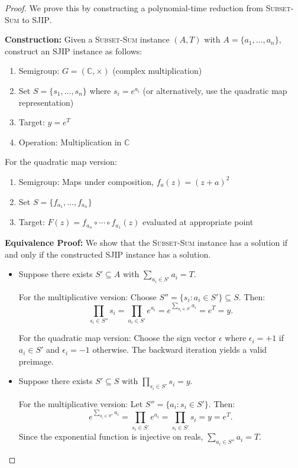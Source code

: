 \documentclass[11pt]{article}
\begin{document}
\begin{proof}
We prove this by constructing a polynomial-time reduction from \textsc{Subset-Sum} to \textsc{SJIP}.

\noindent\textbf{Construction:}
Given a \textsc{Subset-Sum} instance $(A, T)$ with $A = \{a_1, \dots, a_n\}$, construct an \textsc{SJIP} instance as follows:
\begin{enumerate}
    \item Semigroup: $G = (\mathbb{C}, \times)$ (complex multiplication)
    \item Set $S = \{s_1, \dots, s_n\}$ where $s_i = e^{a_i}$ (or alternatively, use the quadratic map representation)
    \item Target: $y = e^T$
    \item Operation: Multiplication in $\mathbb{C}$
\end{enumerate}
For the quadratic map version:
\begin{enumerate}
    \item Semigroup: Maps under composition, $f_a(z) = (z + a)^2$
    \item Set $S = \{f_{a_1}, \dots, f_{a_n}\}$
    \item Target: $F(z) = f_{a_n} \circ \cdots \circ f_{a_1}(z)$ evaluated at appropriate point
\end{enumerate}

\noindent\textbf{Equivalence Proof:}
We show that the \textsc{Subset-Sum} instance has a solution if and only if the constructed \textsc{SJIP} instance has a solution.

\begin{itemize}
    \item[($\Rightarrow$)] Suppose there exists $S' \subseteq A$ with $\sum_{a_i \in S'} a_i = T$. 
    
    For the multiplicative version: Choose $S'' = \{s_i : a_i \in S'\} \subseteq S$. Then:
    \[
    \prod_{s_i \in S''} s_i = \prod_{a_i \in S'} e^{a_i} = e^{\sum_{a_i \in S'} a_i} = e^T = y.
    \]
    
    For the quadratic map version: Choose the sign vector $\epsilon$ where $\epsilon_i = +1$ if $a_i \in S'$ and $\epsilon_i = -1$ otherwise. The backward iteration yields a valid preimage.

    \item[($\Leftarrow$)] Suppose there exists $S' \subseteq S$ with $\prod_{s_i \in S'} s_i = y$.
    
    For the multiplicative version: Let $S'' = \{a_i : s_i \in S'\}$. Then:
    \[
    e^{\sum_{a_i \in S''} a_i} = \prod_{s_i \in S'} e^{a_i} = \prod_{s_i \in S'} s_i = y = e^T.
    \]
    Since the exponential function is injective on reals, $\sum_{a_i \in S''} a_i = T$.
    

\end{itemize}
\end{proof}
\end{document}
